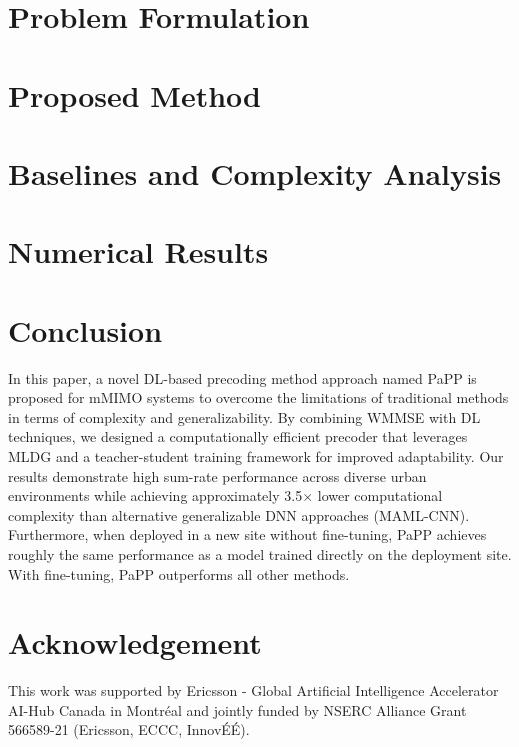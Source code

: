 \documentclass[conference]{IEEEtran}
\begin{document}
\section{Problem Formulation} \label{Sec:Problem_Formulation}


\section{Proposed Method} \label{Sec:Proposed}



\section{Baselines and Complexity Analysis} \label{Sec:Complexity}



\section{Numerical Results} 
\label{Sec:Simulation}


\section{Conclusion} \label{Sec:conclusion}
In this paper, a novel \gls{DL}-based precoding method approach named PaPP is proposed for mMIMO systems to overcome the limitations of traditional methods in terms of complexity and generalizability. By combining WMMSE with DL techniques, we designed a computationally efficient precoder that leverages MLDG and a teacher-student training framework for improved adaptability. Our results demonstrate high sum-rate performance across diverse urban environments while achieving approximately 3.5$\times$ lower computational complexity than alternative generalizable DNN approaches (MAML-CNN).  Furthermore, when deployed in a new site without fine-tuning, PaPP achieves roughly the same performance as a model trained directly on the deployment site. With fine-tuning, PaPP outperforms all other methods. 

\section*{Acknowledgement}
This work was supported by Ericsson - Global Artificial Intelligence Accelerator AI-Hub Canada in Montr\'{e}al and jointly funded by NSERC Alliance Grant 566589-21 (Ericsson, ECCC, Innov\'{E}\'{E}).



\end{document}
